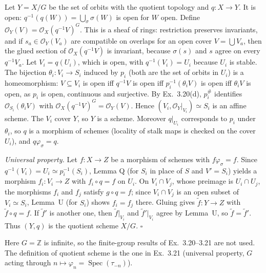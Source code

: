 \documentclass[11pt]{article}
\begin{document}
Let $Y=X/G$ be the set of orbits with the quotient topology and $q:X\to Y$. It is open: $q^{-1}(q(W))=\bigcup_\sigma\sigma(W)$ is open for $W$ open. Define $\mathcal{O}_Y(V)=\mathcal{O}_X(q^{-1}V)^G$. This is a sheaf of rings: restriction preserves invariants, and if $s_a\in\mathcal{O}_Y(V_a)$ are compatible on overlaps for an open cover $V=\bigcup V_a$, then the glued section of $\mathcal{O}_X(q^{-1}V)$ is invariant, because $\sigma(s)$ and $s$ agree on every $q^{-1}V_a$. Let $V_i=q(U_i)$, which is open, with $q^{-1}(V_i)=U_i$ because $U_i$ is stable. The bijection $\theta_i:V_i\to S_i$ induced by $p_i$ (both are the set of orbits in $U_i$) is a homeomorphism: $V\subseteq V_i$ is open iff $q^{-1}V$ is open iff $p_i^{-1}(\theta_iV)$ is open iff $\theta_iV$ is open, as $p_i$ is open, continuous and surjective. By Ex.~3.20(d), $p_i^\#$ identifies $\mathcal{O}_{S_i}(\theta_iV)$ with $\mathcal{O}_X(q^{-1}V)^G=\mathcal{O}_Y(V)$. Hence $(V_i,\mathcal{O}_Y|_{V_i})\simeq S_i$ is an affine scheme. The $V_i$ cover $Y$, so $Y$ is a scheme. Moreover $q|_{U_i}$ corresponds to $p_i$ under $\theta_i$, so $q$ is a morphism of schemes (locality of stalk maps is checked on the cover $U_i$), and $q\varphi_\sigma=q$.

\emph{Universal property.} Let $f:X\to Z$ be a morphism of schemes with $f\varphi_\sigma=f$. Since $q^{-1}(V_i)=U_i\simeq p_i^{-1}(S_i)$, Lemma Q (for $S_i$ in place of $S$ and $V'=S_i$) yields a morphism $f_i:V_i\to Z$ with $f_i\circ q=f$ on $U_i$. On $V_i\cap V_j$, whose preimage is $U_i\cap U_j$, the morphisms $f_i$ and $f_j$ satisfy $g\circ q=f$; since $V_i\cap V_j$ is an open subset of $V_i\simeq S_i$, Lemma~U (for $S_i$) shows $f_i=f_j$ there. Gluing gives $\tilde f:Y\to Z$ with $\tilde f\circ q=f$. If $\tilde f'$ is another one, then $\tilde f|_{V_i}$ and $\tilde f'|_{V_i}$ agree by Lemma~U, so $\tilde f=\tilde f'$. Thus $(Y,q)$ is the quotient scheme $X/G$. \hfill$\square$

\pf
Here $G=\mathbb{Z}$ is infinite, so the finite-group results of Ex.~3.20--3.21 are not used. The definition of quotient scheme is the one in Ex.~3.21 (universal property, $G$ acting through $n\mapsto\varphi_n=\operatorname{Spec}(\tau_{-n})$).
\end{document}
